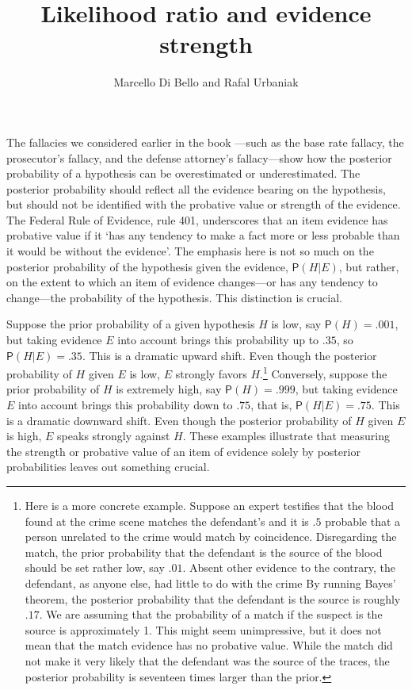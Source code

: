 \documentclass[
  10pt,
  dvipsnames,enabledeprecatedfontcommands]{scrartcl}
\title{Likelihood ratio and evidence strength}
\author{Marcello Di Bello and Rafal Urbaniak}
\date{}
\newcommand{\pr}[1]{\mathsf{P}(#1)}
\begin{document}
\maketitle

The fallacies we considered earlier in the book
---such as the base rate fallacy, the prosecutor's
fallacy, and the defense attorney's fallacy---show how the posterior
probability of a hypothesis can be overestimated or underestimated. The
posterior probability should reflect all the evidence bearing on the
hypothesis, but should not be identified with the probative value or
strength of the evidence. The Federal Rule of Evidence, rule 401,
underscores that an item evidence has probative value if it `has any
tendency to make a fact more or less probable than it would be without
the evidence'. The emphasis here is not so much on the posterior
probability of the hypothesis given the evidence, \(\pr{H \vert E}\),
but rather, on the extent to which an item of evidence changes---or has
any tendency to change---the probability of the hypothesis. This
distinction is crucial.

Suppose the prior probability of a given hypothesis \(H\) is low, say
\(\pr{H}=.001\), but taking evidence \(E\) into account brings this
probability up to \(.35\), so \(\pr{H \vert E}=.35\). This is a dramatic
upward shift. Even though the posterior probability of \(H\) given \(E\)
is low, \(E\) strongly favors \(H\).\footnote{Here is a more concrete
  example. Suppose an expert testifies that the blood found at the crime
  scene matches the defendant's and it is \(.5\) probable that a person
  unrelated to the crime would match by coincidence. Disregarding the
  match, the prior probability that the defendant is the source of the
  blood should be set rather low, say \(.01\). Absent other evidence to
  the contrary, the defendant, as anyone else, had little to do with the
  crime By running Bayes' theorem, the posterior probability that the
  defendant is the source is roughly \(.17\). We are assuming that the
  probability of a match if the suspect is the source is approximately
  1. This might seem unimpressive, but it does not mean that the match
  evidence has no probative value. While the match did not make it very
  likely that the defendant was the source of the traces, the posterior
  probability is seventeen times larger than the prior.} Conversely,
suppose the prior probability of \(H\) is extremely high, say
\(\pr{H}=.999\), but taking evidence \(E\) into account brings this
probability down to \(.75\), that is, \(\pr{H \vert E}=.75\). This is a
dramatic downward shift. Even though the posterior probability of \(H\)
given \(E\) is high, \(E\) speaks strongly against \(H\). These examples
illustrate that measuring the strength or probative value of an item of
evidence solely by posterior probabilities leaves out something crucial.
\end{document}
